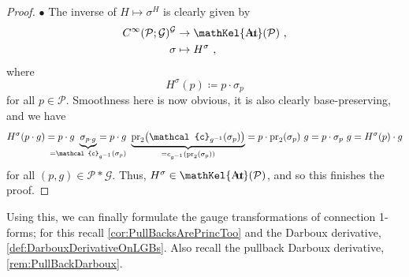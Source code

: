 \documentclass[reqno,a4paper,oneside]{amsart}
\theoremstyle{plain}
\theoremstyle{remark}
\theoremstyle{definition}
\def\bas#1\eas{\begin{align*}#1\end{align*}}
\DeclareMathOperator{\sAut}{\mathKel{A\mkern-5.5mu u\mkern-4mu t\mkern-1.5mu}}
\begin{document}
\begin{proof}
$\bullet$ The inverse of $H \mapsto \sigma^H$ is clearly given by
\begin{align*}
C^\infty(\mathcal{P}; \mathcal{G})^{\mathcal{G}} &\to \sAut(\mathcal{P})~,\\
\sigma &\mapsto H^\sigma~,
\end{align*}
where 
\begin{equation*}
H^\sigma(p)
\coloneqq
p \cdot \sigma_p
\end{equation*}
for all $p \in \mathcal{P}$. Smoothness here is now obvious, it is also clearly base-preserving, and we have 
\begin{equation*}
H^\sigma(p \cdot g)
=
p \cdot g ~ \underbrace{\sigma_{p \cdot g}}_{\mathclap{ = \mathcal{c}_{g^{-1}}\mleft(\sigma_p\mright) }}
=
p \cdot g ~ \underbrace{\mathrm{pr}_2\mleft( \mathcal{c}_{g^{-1}}\mleft(\sigma_p\mright) \mright)}_{\mathclap{ = c_{g^{-1}}\mleft( \mathrm{pr}_2(\sigma_p) \mright) }}
=
p \cdot \mathrm{pr}_2\mleft( \sigma_p \mright) ~ g
=
p \cdot \sigma_p ~ g
=
H^\sigma(p) \cdot g
\end{equation*}
for all $(p, g) \in \mathcal{P} * \mathcal{G}$. Thus, $H^\sigma \in \sAut(\mathcal{P})$, and so this finishes the proof.
%
\end{proof}

Using this, we can finally formulate the gauge transformations of connection 1-forms; for this recall \ref{cor:PullBacksArePrincToo} and the Darboux derivative, \ref{def:DarbouxDerivativeOnLGBs}. Also recall the pullback Darboux derivative, \ref{rem:PullBackDarboux}.
\end{document}
